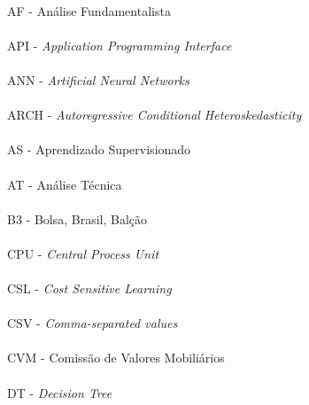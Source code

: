\paragraph{}AF - Análise Fundamentalista
\paragraph{}API - \textit{Application Programming Interface}
\paragraph{}ANN - \textit{Artificial Neural Networks}
\paragraph{}ARCH - \textit{Autoregressive Conditional Heteroskedasticity}
\paragraph{}AS - Aprendizado Supervisionado
\paragraph{}AT - Análise Técnica
\paragraph{}B3 - Bolsa, Brasil, Balção
\paragraph{}CPU - \textit{Central Process Unit}
\paragraph{}CSL - \textit{Cost Sensitive Learning}
\paragraph{}CSV - \textit{Comma-separated values}
\paragraph{}CVM - Comissão de Valores Mobiliários
\paragraph{}DT - \textit{Decision Tree}
